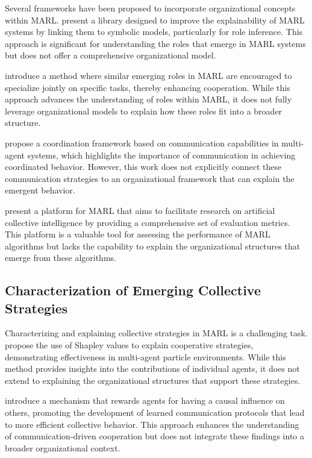 \documentclass[sn-mathphys-num]{sn-jnl}%
\theoremstyle{thmstyleone}%
\theoremstyle{thmstyletwo}%
\theoremstyle{thmstylethree}%
\begin{document}
Several frameworks have been proposed to incorporate organizational concepts within MARL. \cite{kazhdan2020marlme} present a library designed to improve the explainability of MARL systems by linking them to symbolic models, particularly for role inference. This approach is significant for understanding the roles that emerge in MARL systems but does not offer a comprehensive organizational model.

\cite{wang2020role} introduce a method where similar emerging roles in MARL are encouraged to specialize jointly on specific tasks, thereby enhancing cooperation. While this approach advances the understanding of roles within MARL, it does not fully leverage organizational models to explain how these roles fit into a broader structure.

\cite{tosic2010communication} propose a coordination framework based on communication capabilities in multi-agent systems, which highlights the importance of communication in achieving coordinated behavior. However, this work does not explicitly connect these communication strategies to an organizational framework that can explain the emergent behavior.

\cite{zheng2018collective} present a platform for MARL that aims to facilitate research on artificial collective intelligence by providing a comprehensive set of evaluation metrics. This platform is a valuable tool for assessing the performance of MARL algorithms but lacks the capability to explain the organizational structures that emerge from these algorithms.

\subsection{Characterization of Emerging Collective Strategies}

Characterizing and explaining collective strategies in MARL is a challenging task. \cite{heuillet2022shapley} propose the use of Shapley values to explain cooperative strategies, demonstrating effectiveness in multi-agent particle environments. While this method provides insights into the contributions of individual agents, it does not extend to explaining the organizational structures that support these strategies.

\cite{jaques2019social} introduce a mechanism that rewards agents for having a causal influence on others, promoting the development of learned communication protocols that lead to more efficient collective behavior. This approach enhances the understanding of communication-driven cooperation but does not integrate these findings into a broader organizational context.
\end{document}
